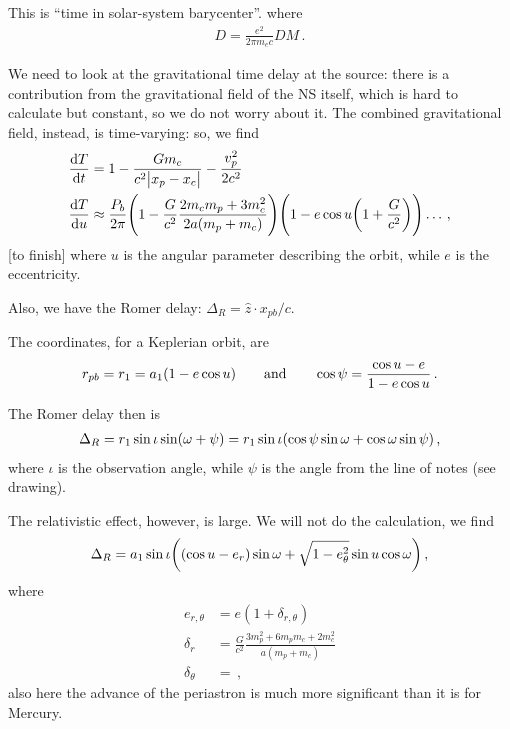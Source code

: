 \documentclass[main.tex]{subfiles}
\begin{document}
This is ``time in solar-system barycenter''.
where
%
\begin{align}
D = \frac{e^2}{2 \pi m_e c} DM
\,.
\end{align}

We need to look at the gravitational time delay at the source: there is a contribution from the gravitational field of the NS itself, which is hard to calculate but constant, so we do not worry about it. 
The combined gravitational field, instead, is time-varying: so, we find 
%
\begin{align}
\dv{T}{t} &= 1 - \frac{G m_c}{c^2 \abs{x_p - x_c}} - \frac{v_p^2}{2 c^2}  \\
 \dv{T}{u} &\approx \frac{P_b}{2 \pi } \qty(1 - \frac{G}{c^2} \frac{2 m_c m_p + 3 m_c^2}{2 a (m_p + m_c)})\qty(1 - e \cos u \qty(1 + \frac{G}{c^2})) \dots
\,,
\end{align}
%
[to finish]
where \(u\) is the angular parameter describing the orbit, while \(e\) is the eccentricity.

Also, we have the Romer delay: \(\Delta_{R} = \hat{z} \cdot x_{pb} / c\). 

The coordinates, for a Keplerian orbit, are 
%
\begin{align}
r_{pb} = r_1 = a_1 \qty(1 - e \cos u )
\qquad \text{and} \qquad
\cos \psi = \frac{\cos u - e}{1- e \cos u}
\,.
\end{align}

The Romer delay then is 
%
\begin{align}
\Delta_{R} = r_1 \sin \iota \sin(\omega+\psi ) 
= r_1 \sin \iota \qty(\cos \psi \sin \omega + \cos \omega \sin \psi )
\,,
\end{align}
%
where \(\iota \) is the observation angle, while \(\psi \) is the angle from the line of notes (see drawing). 

The relativistic effect, however, is large. 
We will not do the calculation, we find 
%
\begin{align}
\Delta_{R} = a_1 \sin \iota 
\qty((\cos u - e_r ) \sin \omega + \sqrt{1 - e^2_{\theta }} \sin u \cos \omega )
\,, 
\end{align}
%
where 
%
\begin{align}
e_{r, \theta } &= e (1 + \delta_{r, \theta })  \\
\delta_{r} &= \frac{G}{c^2} \frac{3 m_p^2 + 6 m_p m_c + 2 m_c^2}{a (m_p + m_c)}  \\
\delta_{\theta } &= 
\,,
\end{align}
%
also here the advance of the periastron is much more significant than it is for Mercury. 
\end{document}
